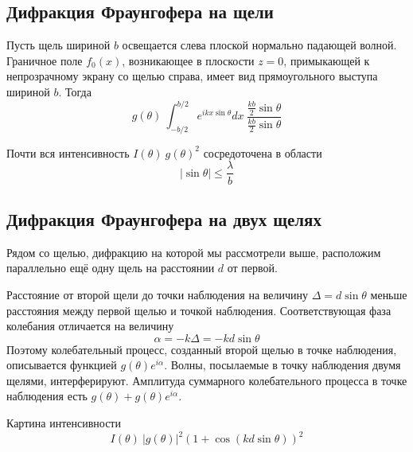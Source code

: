 \subsection{Дифракция Фраунгофера на щели}
Пусть щель шириной $b$ освещается слева плоской нормально падающей волной. Граничное поле $f_{0}(x)$, возникающее в плоскости $z = 0$, примыкающей к непрозрачному экрану со щелью справа, имеет вид прямоугольного выступа шириной $b$. Тогда 
\[
    g(\theta) ~ \int_{-b/2}^{b/2} e^{ikx\sin \theta}dx ~ \frac{\frac{kb}{2}\sin \theta}{\frac{kb}{2}\sin \theta}
\]
\begin{figure}[ht!]
\end{figure}


Почти вся интенсивность $I(\theta) ~ g(\theta)^{2}$ сосредоточена в области
\[
    \left|\sin \theta \right| \le \frac{ \lambda}{b}
\]

\subsection{Дифракция Фраунгофера на двух щелях}
Рядом со щелью, дифракцию на которой мы рассмотрели выше, расположим параллельно ещё одну щель на расстоянии $d$ от первой.

Расстояние от второй щели до точки наблюдения на величину $ \Delta = d\sin\theta$  меньше расстояния между первой щелью и точкой наблюдения. Соответствующая фаза колебания отличается на величину
\[
    \alpha = -k \Delta = -kd \sin \theta
\]
Поэтому колебательный процесс, созданный второй щелью в точке наблюдения, описывается функцией $g( \theta)e^{i \alpha}$.  Волны, посылаемые в точку наблюдения двумя щелями, интерферируют. Амплитуда суммарного колебательного процесса в точке наблюдения есть $g( \theta) + g( \theta)e^{i \alpha}$.

Картина интенсивности 
\[
    I( \theta) ~ \left| g( \theta) \right|^{2} \left(1 + \cos \left(kd \sin \theta\right)\right)^{2}
\]

\begin{figure}[ht!]
\end{figure}


